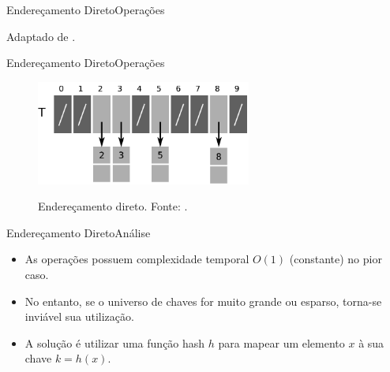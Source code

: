 \documentclass[aspectratio=169]{beamer}
\begin{document}
\begin{frame}{Endereçamento Direto}{Operações}


\tiny{Adaptado de .}
\end{frame}

\begin{frame}{Endereçamento Direto}{Operações}
\begin{figure}[!h]
  \centering
  \includegraphics[width=200pt]{imagens/exemplo_tabela_enderecamento_direto.png}
  \label{fig_exemplo_tabela_enderecamento_direto}
  \caption{Endereçamento direto. Fonte: .}  
\end{figure}
\end{frame}

\begin{frame}{Endereçamento Direto}{Análise}
\begin{itemize}
\item As operações possuem complexidade temporal $O(1)$ (constante) no pior caso.
\item No entanto, se o universo de chaves for muito grande ou esparso, torna-se inviável sua utilização.
\item A solução é utilizar uma função hash $h$ para mapear um elemento $x$ à sua chave $k=h(x)$.
\end{itemize}
\end{frame}
\end{document}

